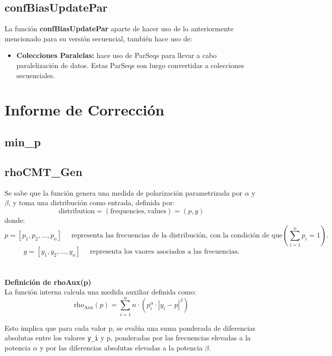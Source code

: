 \documentclass{article}
\begin{document}
    \subsection{confBiasUpdatePar}
    La función \textbf{confBiasUpdatePar} aparte de hacer uso de lo anteriormente mencionado para su versión secuencial, también hace uso de:

    \begin{itemize}
      \item \textbf{Colecciones Paralelas:} hace uso de ParSeqs para llevar a cabo paralelización de datos. Estas ParSeqs son luego convertidas a colecciones secuenciales.
    \end{itemize}

  \section{Informe de Corrección}

    \subsection{min\_p}

    \subsection{rhoCMT\_Gen}
	
	Se sabe que la función genera una medida de polarización parametrizada por $\alpha$ y $\beta$, y toma una distribución como entrada, definida por:  
	\[
	\text{distribution} = (\text{frequencies}, \text{values}) = (p, y)
	\]  
	donde: 
	\[
	p = [p_1, p_2, \dots, p_n] \quad \text{ representa las frecuencias de la distribución, con la condición de que}  \left(\sum_{i=1}^n p_i = 1\right).
	\]  
	\[
	y = [y_1, y_2, \dots, y_n] \quad \text{ representa los vaores asociados a las frecuencias.}
	\]  
	\\\\
	\textbf{Definición de rhoAux(p)}\\

	La función interna calcula una medida auxiliar definida como:
	\[
	\text{rho}_{\text{Aux}}(p) = \sum_{i=1}^n n \cdot (p_i^\alpha \cdot |y_i - p|^\beta)
	\]  
	
	Esto implica que para cada valor p, se evalúa una suma ponderada de diferencias absolutas entre los valores \texttt{y\_i} y p, ponderadas por las frecuencias elevadas a la potencia $\alpha$ y por las diferencias absolutas elevadas a la potencia $\beta$.
	\\
	
\end{document}
